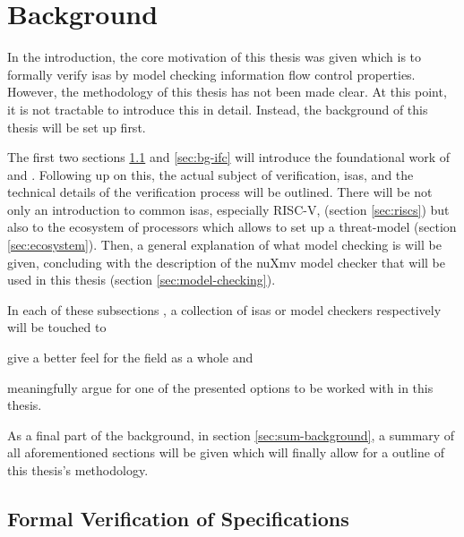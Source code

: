 
\chapter{Background}
\label{chp:background}

In the introduction, the core motivation of this thesis was given which is to formally verify \glspl{isa} by model checking information flow control properties.
However, the methodology of this thesis has not been made clear.
At this point, it is not tractable to introduce this in detail.
Instead, the background of this thesis will be set up first.

The first two sections \ref{sec:verify-spec} and \ref{sec:bg-ifc} will introduce the foundational work of \citeauthor{Reid17} \cite{Reid17} and \citeauthor{Ferraiuolo17} \cite{Ferraiuolo17}.
Following up on this, the actual subject of verification, \glspl{isa}, and the technical details of the verification process will be outlined.
There will be not only an introduction to common \glspl{isa}, especially RISC-V, (section \ref{sec:riscs}) but also to the ecosystem of processors which allows to set up a threat-model (section \ref{sec:ecosystem}).
Then, a general explanation of what model checking is will be given, concluding with the description of the nuXmv model checker that will be used in this thesis (section \ref{sec:model-checking}).

In each of these subsections , a collection of \glspl{isa} or model checkers respectively will be touched to \begin{enumerate*}[label=\alph*)]
    \item give a better feel for the field as a whole and
    \item meaningfully argue for one of the presented options to be worked with in this thesis.
\end{enumerate*}

As a final part of the background, in section \ref{sec:sum-background}, a summary of all aforementioned sections will be given which will finally allow for a outline of this thesis's methodology.

\section{Formal Verification of Specifications}
\label{sec:verify-spec}

